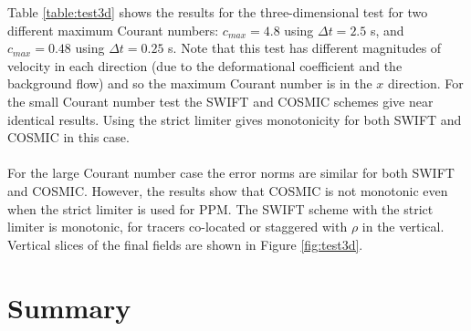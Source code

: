\documentclass{ametsocV6.1}
\begin{document}
Table \ref{table:test3d} shows the results for the three-dimensional test for two different maximum Courant numbers: $c_{max}=4.8$ using $\Delta t=2.5$ s, and $c_{max}=0.48$ using $\Delta t=0.25$ s. Note that this test has different magnitudes of velocity in each direction (due to the deformational coefficient and the background flow) and so the maximum Courant number is in the $x$ direction. For the small Courant number test the SWIFT and COSMIC schemes give near identical results. Using the strict limiter gives monotonicity for both SWIFT and COSMIC in this case.
\\
\\
For the large Courant number case the error norms are similar for both SWIFT and COSMIC. However, the results show that COSMIC is not monotonic even when the strict limiter is used for PPM. The SWIFT scheme with the strict limiter is monotonic, for tracers co-located or staggered with $\rho$ in the vertical.
Vertical slices of the final fields are shown in Figure \ref{fig:test3d}.

\section{Summary}
\end{document}
